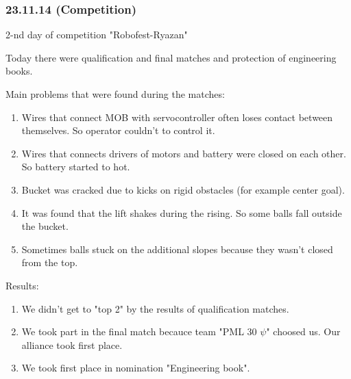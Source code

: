 \subsubsection{23.11.14 (Competition)}
\begin{center}
	2-nd day of competition "Robofest-Ryazan"
\end{center}
Today there were qualification and final matches and protection of engineering books.
\newline 

Main problems that were found during the matches:
\begin{enumerate}
	\item Wires that connect MOB with servocontroller often loses contact between themselves. So operator couldn't to control it.
	
	\item Wires that connects drivers of motors and battery were closed on each other. So battery started to hot.
	
	\item Bucket was cracked due to kicks on rigid obstacles (for example center goal).
	
	\item It was found that the lift shakes during the rising. So some balls fall outside the bucket.
	
	\item Sometimes balls stuck on the additional slopes because they wasn't closed from the top.
	
\end{enumerate}

Results:
\begin{enumerate}
	\item We didn't get to "top 2" by the results of qualification matches.
	
	\item We took part in the final match becauce team "PML 30 ${\psi}$" choosed us. Our alliance took first place.
	
	\item We took first place in nomination "Engineering book".
\end{enumerate}

